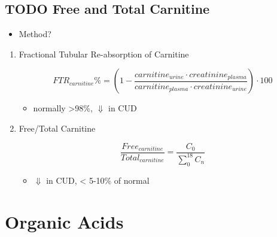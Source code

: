 \documentclass{scrartcl}
\begin{document}
\subsection{{\bfseries\sffamily TODO} Free and Total Carnitine}
\label{sec:orgdbd5f92}
\begin{itemize}
\item Method?
\end{itemize}
\begin{enumerate}
\item Fractional Tubular Re-absorption of Carnitine
\label{sec:org651527d}

\begin{LaTeX}
\begin{equation*}
FTR_{carnitine}\% = \left( 1 -  \frac{carnitine_{urine} \cdot creatinine_{plasma}}{carnitine_{plasma} \cdot creatinine_{urine}}\right) \cdot 100
\end{equation*}
\end{LaTeX}

\begin{itemize}
\item normally >98\%, \(\Downarrow\) in CUD
\end{itemize}

\item Free/Total Carnitine
\label{sec:org0f652f5}

\[
\frac{Free_{carnitine}}{Total_{carnitine}} = \frac{C_0}{\sum_{0}^{18} C_n}
\]

\begin{itemize}
\item \(\Downarrow\) in CUD, < 5-10\% of normal
\end{itemize}
\end{enumerate}
\section{Organic Acids}
\label{sec:orgab4bec0}
\end{document}

